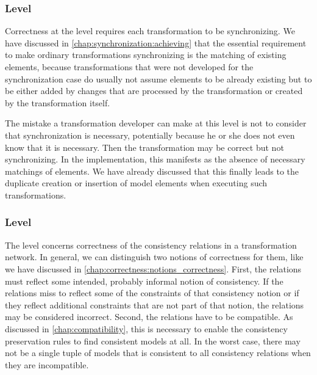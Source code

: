 \subsubsection*{\LevelTransformation Level}

Correctness at the \leveltransformation level requires each transformation to be synchronizing.
We have discussed in \autoref{chap:synchronization:achieving} that the essential requirement to make ordinary transformations synchronizing is the matching of existing elements, because transformations that were not developed for the synchronization case do usually not assume elements to be already existing but to be either added by changes that are processed by the transformation or created by the transformation itself.

The mistake a transformation developer can make at this level is not to consider that synchronization is necessary, potentially because he or she does not even know that it is necessary. Then the transformation may be correct but not synchronizing.
In the implementation, this manifests as the absence of necessary matchings of elements.
We have already discussed that this finally leads to the duplicate creation or insertion of model elements when executing such transformations.


\subsubsection*{\LevelNetworkRelation Level}

The \levelnetworkrelation level concerns correctness of the consistency relations in a transformation network.
In general, we can distinguish two notions of correctness for them, like we have discussed in \autoref{chap:correctness:notions_correctness}.
First, the relations must reflect some intended, probably informal notion of consistency.
If the relations miss to reflect some of the constraints of that consistency notion or if they reflect additional constraints that are not part of that notion, the relations may be considered incorrect.
Second, the relations have to be compatible.
As discussed in \autoref{chap:compatibility}, this is necessary to enable the consistency preservation rules to find consistent models at all.
In the worst case, there may not be a single tuple of models that is consistent to all consistency relations when they are incompatible.

